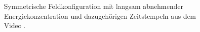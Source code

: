 \begin{figure}
    \begin{center}
        \hfill
        \caption{Symmetrische Feldkonfiguration mit langsam abnehmender Energiekonzentration und dazugehörigen Zeitstempeln aus dem Video \cite{particles:video-particle}.}\label{particles:fig:partikel:abnehmen:symmetrisch}
    \end{center}
\end{figure}
